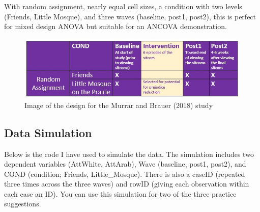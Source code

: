 \documentclass[
  11pt,
]{book}
\begin{document}
With random assignment, nearly equal cell sizes, a condition with two levels (Friends, Little Mosque), and three waves (baseline, post1, post2), this is perfect for mixed design ANOVA but suitable for an ANCOVA demonstration.

\begin{figure}
\centering
\includegraphics{images/mixed/Murrar_design.jpg}
\caption{Image of the design for the Murrar and Brauer (2018) study}
\end{figure}

\hypertarget{data-simulation-6}{%
\subsection{Data Simulation}\label{data-simulation-6}}

Below is the code I have used to simulate the data. The simulation includes two dependent variables (AttWhite, AttArab), Wave (baseline, post1, post2), and COND (condition; Friends, Little\_Mosque). There is also a caseID (repeated three times across the three waves) and rowID (giving each observation within each case an ID). You can use this simulation for two of the three practice suggestions.
\end{document}
